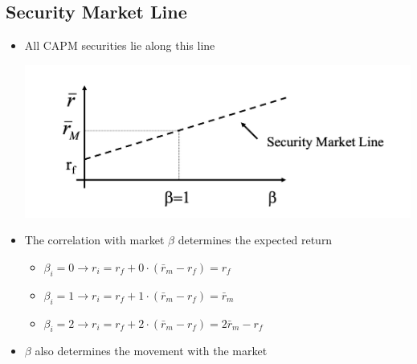 \documentclass[11pt]{article}
\begin{document}
\subsection{Security Market Line}
\begin{itemize}
\item All CAPM securities lie along this line 
\begin{center}
\includegraphics[scale=0.4]{images/sml.png} 
\end{center}
\item The correlation with market $\beta$ determines the expected return
\begin{itemize}
\item $\beta_i = 0 \rightarrow r_i = r_f + 0 \cdot (\bar{r}_m - r_f) = r_f $
\item $\beta_i = 1 \rightarrow r_i = r_f + 1 \cdot (\bar{r}_m - r_f) = \bar{r}_m $
\item $\beta_i = 2 \rightarrow r_i = r_f + 2 \cdot (\bar{r}_m - r_f) = 2\bar{r}_m -r_f $
\end{itemize}
\item $\beta$ also determines the movement with the market
\end{itemize}
\end{document}
